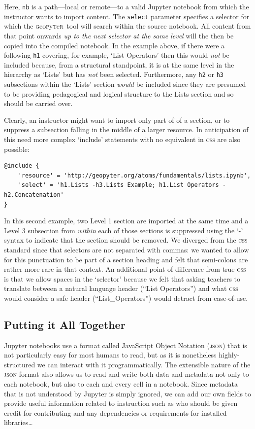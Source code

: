 \documentclass[letter, 11pt,titlepage]{article}
\newcommand{\gp}{\textsc{g}eo\textsc{p}y\textsc{t}e\textsc{r}~\/}
\begin{document}
Here, \texttt{nb} is a path---local or remote---to a valid Jupyter notebook from which the instructor wants to import content. The \texttt{select} parameter specifies a selector for which the \gp tool will search within the source notebook. All content from that point onwards \emph{up to the next selector at the same level} will the then be copied into the compiled notebook. In the example above, if there were a following \texttt{h1} covering, for example, `List Operators' then this would \emph{not} be included because, from a structural standpoint, it is at the same level in the hierarchy as `Lists' but has \emph{not} been selected. Furthermore, any \texttt{h2} or \texttt{h3} subsections within the `Lists' section \emph{would} be included since they are presumed to be providing pedagogical and logical structure to the Lists section and so should be carried over.

Clearly, an instructor might want to import only part of of a section, or to suppress a subsection falling in the middle of a larger resource. In anticipation of this need more complex `include' statements with no equivalent in \textsc{css} are also possible:
\begin{Verbatim}[fontsize=\small]
@include {
    'resource' = 'http://geopyter.org/atoms/fundamentals/lists.ipynb',
    'select' = 'h1.Lists -h3.Lists Example; h1.List Operators -h2.Concatenation'
}
\end{Verbatim}
In this second example, two Level 1 section are imported at the same time and a Level 3 subsection from \emph{within} each of those sections is suppressed using the `-' syntax to indicate that the section should be removed. We diverged from the \textsc{css} standard since that selectors are not separated with commas: we wanted to allow for this punctuation to be part of a section heading and felt that semi-colons are rather more rare in that context. An additional point of difference from true \textsc{css} is that we allow spaces in the `selector' because we felt that asking teachers to translate between a natural language header (``List Operators'') and what \textsc{css} would consider a safe header (``List\_Operators'') would detract from ease-of-use.

\subsection{Putting it All Together}

Jupyter notebooks use a format called JavaScript Object Notation (\textsc{json}) that is not particularly easy for most humans to read, but as it is nonetheless highly-structured we can interact with it programmatically. The extensible nature of the \textsc{json} format also allows us to read and write both data and metadata not only to each notebook, but also to each and every cell in a notebook. Since metadata that is not understood by Jupyter is simply ignored, we can add our own fields to provide useful information related to instruction such as who should be given credit for contributing and any dependencies or requirements for installed libraries\ldots
\end{document}
